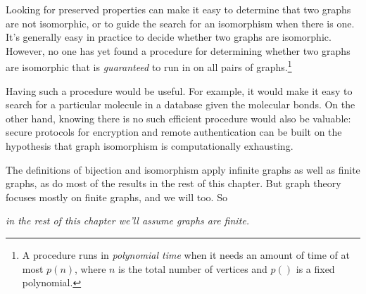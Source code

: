 Looking for preserved properties can make it easy to determine that two
graphs are not isomorphic, or to guide the search for an
isomorphism when there is one.  It's generally easy in practice to decide
whether two graphs are isomorphic.  However, no one has yet found a
procedure for determining whether two graphs are isomorphic that is
\emph{guaranteed} to run in  on all pairs of
graphs.\footnote{A procedure runs in \emph{polynomial
    time} when it needs an amount of time of at most $p(n)$, where $n$ is
  the total number of vertices and $p()$ is a fixed polynomial.}

Having such a procedure would be useful.  For example, it would make it
easy to search for a particular molecule in a database given the molecular
bonds.  On the other hand, knowing there is no such efficient procedure
would also be valuable: secure protocols for encryption and remote
authentication can be built on the hypothesis that graph isomorphism is
computationally exhausting.

\iffalse

An isomorphism between the two graphs shown in
Figure~\ref{fig:isomorphism} is easy to read off:
\[
\begin{array}{lll}
a \text{ corresponds to } 1 & \hspace{0.5in} & b \text{ corresponds to } 2 \\
d \text{ corresponds to } 4 & & c \text{ corresponds to } 3.
\end{array}
\]

To see why this works, look at any edge in the first graph, say
$\edge{b}{c}$, and make sure that the vertices corresponding to $b$ and
$c$ are the endpoints of an edge in the second graph.  Namely, verify that
$\edge{2}{3}$ is an edge of the second graph; and it is.  Conversely, look
at any edge in the second graph, say $\edge{3}{4}$, and verify that the
corresponding vertices are the endpoints of an edge of the first
graph. Namely, verify that $\edge{c}{d}$ is an edge of the first graph;
and it is.  It's a good practice exercise to verify that every edge in
either of these graphs exactly corresponds in this way to an edge in the
other graph.
\fi

The definitions of bijection and isomorphism apply infinite graphs as
well as finite graphs, as do most of the results in the rest of this
chapter.  But graph theory focuses mostly on finite graphs, and we
will too.  So

\emph{in the rest of this chapter we'll assume graphs are finite.}


